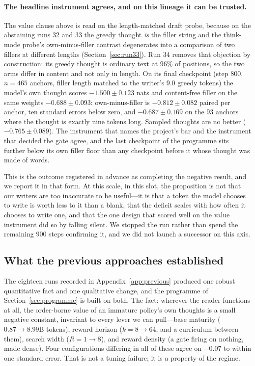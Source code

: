 \documentclass{article} %
\begin{document}
\paragraph{The headline instrument agrees, and on this lineage it can be trusted.} The value
clause above is read on the length-matched draft probe, because on the abstaining runs 32 and 33
the greedy thought \emph{is} the filler string and the think-mode probe's own-minus-filler
contrast degenerates into a comparison of two fillers at different lengths (Section~\ref{sec:run33}).
Run 34 removes that objection by construction: its greedy thought is ordinary text at $96\%$ of
positions, so the two arms differ in content and not only in length. On its final checkpoint
(step $800$, $n=465$ anchors, filler length matched to the writer's $9.0$ greedy tokens) the
model's own thought scores $-1.500 \pm 0.123$ nats and content-free filler on the same weights
$-0.688 \pm 0.093$: own-minus-filler is $-0.812 \pm 0.082$ paired per anchor, ten standard
errors below zero, and $-0.687 \pm 0.169$ on the $93$ anchors where the thought is exactly nine
tokens long. Sampled thoughts are no better ($-0.765 \pm 0.089$). The instrument that names the
project's bar and the instrument that decided the gate agree, and the last checkpoint of the
programme sits further below its own filler floor than any checkpoint before it whose thought
was made of words.

This is the outcome registered in advance as completing the negative result, and we report it in
that form. At this scale, in this slot, the proposition is not that our writers are too
inaccurate to be useful---it is that a token the model chooses to write is worth less to it than
a blank, that the deficit scales with how often it chooses to write one, and that the one design
that scored well on the value instrument did so by falling silent. We stopped the run rather
than spend the remaining $900$ steps confirming it, and we did not launch a successor on this
axis.

\subsection{What the previous approaches established}
\label{sec:established}

 The eighteen runs recorded in Appendix~\ref{app:previous} produced one robust quantitative fact and one qualitative change, and the programme of Section~\ref{sec:programme} is built on both. The fact: wherever the reader functions at all, the order-borne value of an immature policy's own thoughts is a small negative constant, invariant to every lever we can pull---base maturity ($0.87 \to 8.99$B tokens), reward horizon ($k{=}8 \to 64$, and a curriculum between them), search width ($R{=}1 \to 8$), and reward density (a gate firing on nothing, made dense). Four configurations differing in all of these agree on $-0.07$ to within one standard error. That is not a tuning failure; it is a property of the regime.
\end{document}
